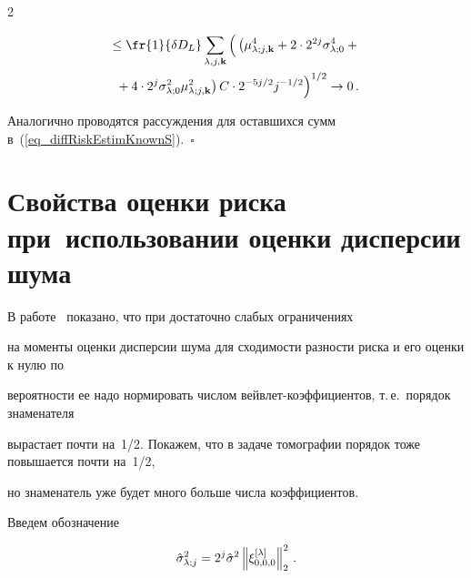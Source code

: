 \begin{multicols}{2}
\noindent


\begin{multline*}


{}\leq \fr{1}{\delta D_L}\sumljk 


\left  ( \vphantom{4\cdot 2^j\solz^2\muljk^2  C\cdot 2^{-5j/2} j^{-1/2}}


\left(


\muljk^4 + 2\cdot 2^{2j}\solz^4 + {}\right.\right.\\


\left.\left.{}+4\cdot 2^j\solz^2\muljk^2 


\right) C\cdot 2^{-5j/2} j^{-1/2} 


\right )^{1/2} \rightarrow 0\,.


\end{multline*}


Аналогично проводятся рассуждения для оставшихся сумм в~(\ref{eq_diffRiskEstimKnownS}).~$\square$





\section{Свойства оценки риска при~использовании оценки дисперсии шума}





В работе~\cite{MarkinShestakovConsist} показано, что при достаточно слабых ограничениях 


на моменты оценки дисперсии шума для сходимости разности риска и его оценки к нулю по 


вероятности ее надо нормировать числом вейвлет-коэффициентов, т.\,е.\ порядок знаменателя 


вырастает почти на~1/2. Покажем, что в задаче томографии порядок тоже повышается почти на~1/2, 


но знаменатель уже будет много больше числа коэффициентов.





Введем обозначение


\begin{equation*}


\hslj = 2^j \hsig \left\|\xi^{[\lambda]}_{0,0,0}\right\|_2^2\,.


\end{equation*}






\end{multicols}
